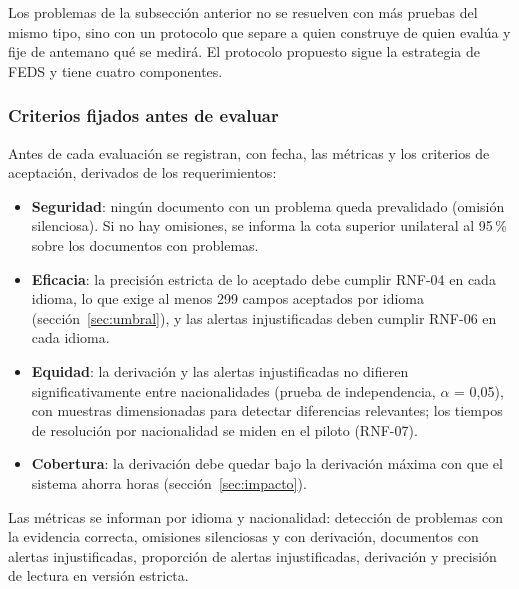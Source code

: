 \documentclass[11pt,a4paper]{article}
\begin{document}
Los problemas de la subsección anterior no se resuelven con más pruebas del mismo tipo, sino con un protocolo que separe a quien construye de quien evalúa y fije de antemano qué se medirá. El protocolo propuesto sigue la estrategia de FEDS \cite{venable2016} y tiene cuatro componentes.

\subsubsection{Criterios fijados antes de evaluar}
Antes de cada evaluación se registran, con fecha, las métricas y los criterios de aceptación, derivados de los requerimientos:
\begin{itemize}
  \item \textbf{Seguridad}: ningún documento con un problema queda prevalidado (omisión silenciosa). Si no hay omisiones, se informa la cota superior unilateral al 95\,\% sobre los documentos con problemas.
  \item \textbf{Eficacia}: la precisión estricta de lo aceptado debe cumplir RNF-04 en cada idioma, lo que exige al menos 299 campos aceptados por idioma (sección~\ref{sec:umbral}), y las alertas injustificadas deben cumplir RNF-06 en cada idioma.
  \item \textbf{Equidad}: la derivación y las alertas injustificadas no difieren significativamente entre nacionalidades (prueba de independencia, $\alpha$ = 0,05), con muestras dimensionadas para detectar diferencias relevantes; los tiempos de resolución por nacionalidad se miden en el piloto (RNF-07).
  \item \textbf{Cobertura}: la derivación debe quedar bajo la derivación máxima con que el sistema ahorra horas (sección~\ref{sec:impacto}).
\end{itemize}
Las métricas se informan por idioma y nacionalidad: detección de problemas con la evidencia correcta, omisiones silenciosas y con derivación, documentos con alertas injustificadas, proporción de alertas injustificadas, derivación y precisión de lectura en versión estricta.
\end{document}
